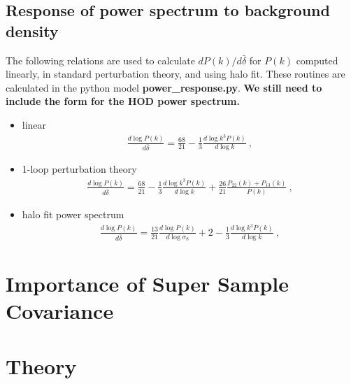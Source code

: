 \documentclass[11pt, oneside]{article}   	%
\begin{document}
\subsection{Response of power spectrum to background density} 
The following relations are used to calculate $ d P(k)/d\bar{\delta}$ for $P(k)$ computed linearly, in standard perturbation theory, and using halo fit. These routines are calculated in the python model \textbf{power\_response.py}. \textbf{We still need to include the form for the HOD power spectrum.} 
\begin{itemize} 
\item{linear 
\begin{align} 
\frac{ d \log P(k)}{d \bar{\delta}}=\frac{68}{21} - \frac{1}{3} \frac{ d \log k^3 P(k)}{d \log k}~, 
\end{align} 
} 
\item{1-loop perturbation theory
\begin{align} 
\frac{ d \log P(k)}{d \bar{\delta}}=\frac{68}{21} - \frac{1}{3} \frac{ d \log k^3 P(k)}{d \log k} + \frac{26}{21} \frac{P_{22}(k) + P_{13}(k)}{P(k)} ~, 
\end{align} 
} 
\item{halo fit power spectrum
\begin{align} 
\frac{ d \log P(k)}{d \bar{\delta}}= \frac{13}{21} \frac{ d \log P(k)}{d \log \sigma_8} + 2 - \frac{1}{3} \frac{ d \log k^3 P(k)}{d \log k}~, 
\end{align} 
}
\end{itemize} 

\section{Importance of Super Sample Covariance} 


\section{Theory}


 






 
\end{document}
